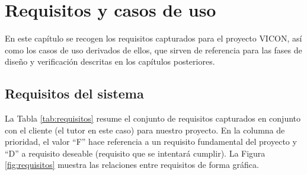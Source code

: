 \documentclass[../main.tex]{subfiles}
\begin{document}
\chapter{Requisitos y casos de uso}
\label{chap:requisitos}

En este capítulo se recogen los requisitos capturados para el proyecto \ac{VICON}, así como los casos de uso derivados de ellos, que sirven de referencia para las fases de diseño y verificación descritas en los capítulos posteriores.

\section{Requisitos del sistema}
\label{sec:requisitos}
La Tabla \ref{tab:requisitos} resume el conjunto de requisitos capturados en conjunto con el cliente (el tutor en este caso) para nuestro proyecto. En la columna de prioridad, el valor “F” hace referencia a un requisito fundamental del proyecto y “D” a requisito deseable (requisito que se intentará cumplir). La Figura \ref{fig:requisitos} muestra las relaciones entre requisitos de forma gráfica.
\end{document}
